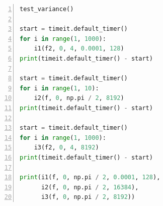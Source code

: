 \documentclass[a4paper,twoside]{article}
\begin{document}
\begin{spacing}{1.2}
\begin{lstlisting}[language=Python,numbers=left,style=PythonStyle,label={code:romberg},caption=基准测试代码]
test_variance()

start = timeit.default_timer()
for i in range(1, 1000):
    i1(f2, 0, 4, 0.0001, 128)
print(timeit.default_timer() - start)

start = timeit.default_timer()
for i in range(1, 10):
    i2(f, 0, np.pi / 2, 8192)
print(timeit.default_timer() - start)

start = timeit.default_timer()
for i in range(1, 1000):
    i3(f2, 0, 4, 8192)
print(timeit.default_timer() - start)

print(i1(f, 0, np.pi / 2, 0.0001, 128),
      i2(f, 0, np.pi / 2, 16384),
      i3(f, 0, np.pi / 2, 8192))
\end{lstlisting}


\end{spacing}
\end{document}
